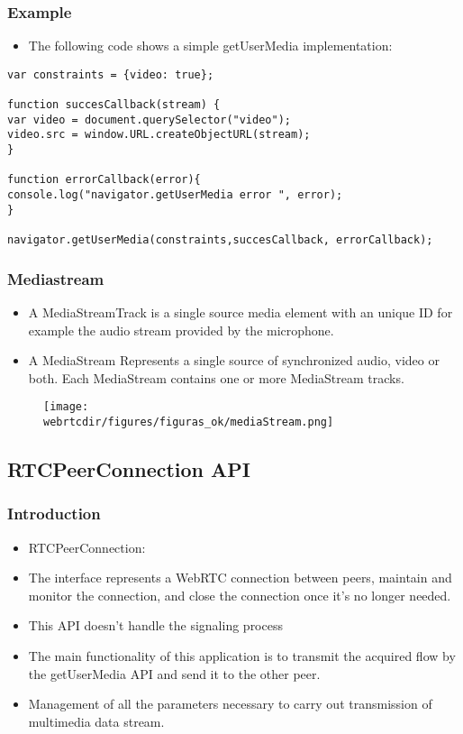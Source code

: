 \begin{frame}[fragile]\frametitle{Example}
\begin{itemize}
\item The following code shows a simple getUserMedia implementation:
\end{itemize}
\begin{lstlisting}[style=JavaScript]
var constraints = {video: true};

function succesCallback(stream) {
var video = document.querySelector("video");
video.src = window.URL.createObjectURL(stream);
}

function errorCallback(error){
console.log("navigator.getUserMedia error ", error);
}

navigator.getUserMedia(constraints,succesCallback, errorCallback);
\end{lstlisting}
\end{frame}

\begin{frame}[fragile]\frametitle{Mediastream}
\begin{itemize}
\item A MediaStreamTrack is a single source media element with an unique ID for example
the audio stream provided by the microphone.
\item A MediaStream Represents a single source of synchronized audio, video or both.
Each MediaStream contains one or more MediaStream tracks. 
\end{itemize}

\begin{figure}[htb]
\begin{centering}
\texttt{[image: \\webrtcdir/figures/figuras\_ok/mediaStream.png]}
\par\end{centering}
\end{figure}
\end{frame}


\subsection{RTCPeerConnection API}

\begin{frame}[fragile]\frametitle{Introduction}
\begin{itemize}
\item RTCPeerConnection:
\item The interface represents a WebRTC connection between peers, 
maintain and monitor the connection, and close the connection once it's no longer
needed.
\item This API doesn't handle the signaling process %
\item The main functionality of this application is to transmit the acquired flow by
the getUserMedia API and send it to the other peer.
\item Management of all the parameters necessary to carry out transmission of multimedia data 
stream.
\end{itemize}
\end{frame}

